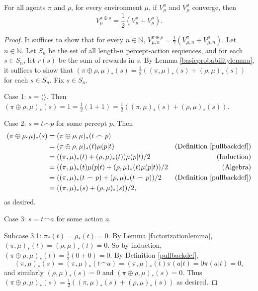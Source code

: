 \documentclass[runningheads]{llncs}
\begin{document}
\begin{theorem}
\label{maintheorem}
    For all agents $\pi$ and $\rho$, for every environment $\mu$,
    if $V^\pi_\mu$ and $V^\rho_\mu$ converge, then
    \[
        V^{\pi\oplus\rho}_\mu = \frac12(V^\pi_\mu+V^\rho_\mu).
    \]
\end{theorem}

\begin{proof}
    It suffices to show that for every $n\in\mathbb N$,
    $V^{\pi\oplus\rho}_{\mu,n}=\frac12(V^\pi_{\mu,n}+V^\rho_{\mu,n})$.
    Let $n\in\mathbb N$. Let $S_n$ be the set of all length-$n$ percept-action
    sequences, and for each $s\in S_n$, let $r(s)$ be the sum of rewards in $s$.
    By Lemma \ref{basicprobabilitylemma}, it suffices to show that
    $(\pi\oplus\rho,\mu)_*(s)=\frac12((\pi,\mu)_*(s)+(\rho,\mu)_*(s))$ for each
    $s\in S_n$. Fix $s\in S_n$.

    Case 1: $s=\langle\rangle$. Then
    $(\pi\oplus\rho,\mu)_*(s)=1=\frac12(1+1)=\frac12((\pi,\mu)_*(s)+(\rho,\mu)_*(s))$.

    Case 2: $s=t\frown p$ for some percept $p$. Then
    \begin{align*}
        (\pi\oplus\rho,\mu)_*(s) &= (\pi\oplus\rho,\mu)_*(t\frown p)\\
            &= (\pi\oplus\rho,\mu)_*(t)\mu(p|t)
                &\mbox{(Definition \ref{pullbackdef})}\\
            &= ((\pi,\mu)_*(t)+(\rho,\mu)_*(t))\mu(p|t)/2
                &\mbox{(Induction)}\\
            &= ((\pi,\mu)_*(t)\mu(p|t) + (\rho,\mu)_*(t)\mu(p|t))/2
                &\mbox{(Algebra)}\\
            &= ((\pi,\mu)_*(t\frown p) + (\rho,\mu)_*(t\frown p))/2
                &\mbox{(Definition \ref{pullbackdef})}\\
            &= ((\pi,\mu)_*(s) + (\rho,\mu)_*(s))/2,
    \end{align*}
    as desired.

    Case 3: $s=t\frown a$ for some action $a$.

    Subcase 3.1: $\pi_*(t)=\rho_*(t)=0$.
        By Lemma \ref{factorizationlemma}, $(\pi,\mu)_*(t)=(\rho,\mu)_*(t)=0$.
        So by induction, $(\pi\oplus\rho,\mu)_*(t)=\frac12(0+0)=0$.
        By Definition \ref{pullbackdef},
        \[
            (\pi,\mu)_*(s)=(\pi,\mu)_*(t\frown a)=(\pi,\mu)_*(t)\pi(a|t)=0\pi(a|t)=0,
        \]
        and similarly $(\rho,\mu)_*(s)=0$ and $(\pi\oplus\rho,\mu)_*(s)=0$.
        Thus $(\pi\oplus\rho,\mu)_*(s)=\frac12((\pi,\mu)_*(s)+(\rho,\mu)_*(s))$
        as desired.


\end{proof}
\end{document}
